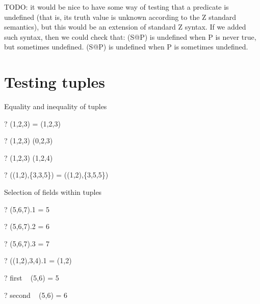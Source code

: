 \documentclass{article}
\begin{document}
TODO: it would be nice to have some way of testing that a predicate is 
      undefined (that is, its truth value is unknown according to the Z 
      standard semantics), but this would be an extension of standard Z syntax.
      If we added such syntax, then we could check that:
      (\exists S@P) is undefined when P is never true, but sometimes undefined.
      (\forall S@P) is undefined when P is sometimes undefined.


\section{Testing tuples}

Equality and inequality of tuples
\begin{zed} \vdash? (1,2,3) = (1,2,3) \end{zed}
\begin{zed} \vdash? (1,2,3) \neq (0,2,3) \end{zed}
\begin{zed} \vdash? (1,2,3) \neq (1,2,4) \end{zed}
\begin{zed} \vdash? ((1,2),\{3,3,5\}) = ((1,2),\{3,5,5\}) \end{zed}

Selection of fields within tuples
\begin{zed} \vdash? (5,6,7).1 = 5 \end{zed}
\begin{zed} \vdash? (5,6,7).2 = 6 \end{zed}
\begin{zed} \vdash? (5,6,7).3 = 7 \end{zed}
\begin{zed} \vdash? ((1,2),3,4).1 = (1,2) \end{zed}
\begin{zed} \vdash? first ~ (5,6) = 5 \end{zed}
\begin{zed} \vdash? second ~ (5,6) = 6 \end{zed}
\end{document}
